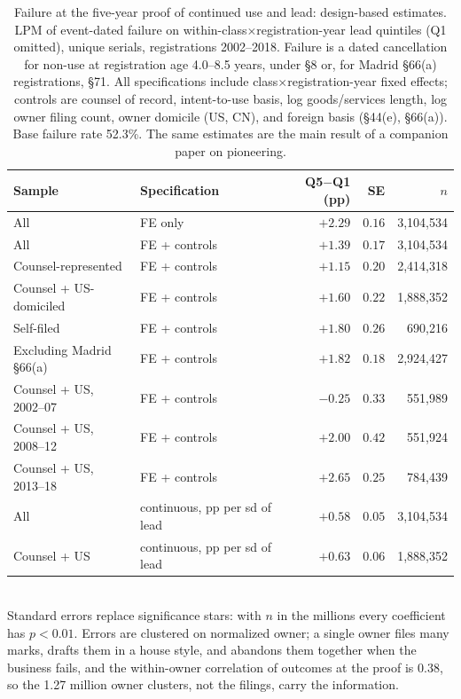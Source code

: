 \begin{table}[!htbp]\centering\small
\caption{Failure at the five-year proof of continued use and lead:
design-based estimates. LPM of event-dated failure on
within-class$\times$registration-year lead quintiles (Q1 omitted),
unique serials, registrations 2002--2018. Failure is a dated
cancellation for non-use at registration age 4.0--8.5 years, under \S8
or, for Madrid \S66(a) registrations, \S71. All specifications include
class$\times$registration-year fixed effects; controls are counsel of
record, intent-to-use basis, log goods/services length, log owner
filing count, owner domicile (US, CN), and foreign basis (\S44(e),
\S66(a)). Base failure rate 52.3\%. The same estimates are the main
result of a companion paper on pioneering.}
\label{tab:gate_lpm}
\begin{tabular}{llrrr}
\toprule
Sample & Specification & Q5$-$Q1 (pp) & SE & $n$ \\
\midrule
All & FE only & $+2.29$ & $0.16$ & 3{,}104{,}534 \\
All & FE + controls & $+1.39$ & $0.17$ & 3{,}104{,}534 \\
Counsel-represented & FE + controls & $+1.15$ & $0.20$ & 2{,}414{,}318 \\
Counsel + US-domiciled & FE + controls & $+1.60$ & $0.22$ & 1{,}888{,}352 \\
Self-filed & FE + controls & $+1.80$ & $0.26$ & 690{,}216 \\
Excluding Madrid \S66(a) & FE + controls & $+1.82$ & $0.18$ & 2{,}924{,}427 \\
\midrule
Counsel + US, 2002--07 & FE + controls & $-0.25$ & $0.33$ & 551{,}989 \\
Counsel + US, 2008--12 & FE + controls & $+2.00$ & $0.42$ & 551{,}924 \\
Counsel + US, 2013--18 & FE + controls & $+2.65$ & $0.25$ & 784{,}439 \\
\midrule
All & continuous, pp per sd of lead & $+0.58$ & $0.05$ & 3{,}104{,}534 \\
Counsel + US & continuous, pp per sd of lead & $+0.63$ & $0.06$ & 1{,}888{,}352 \\
\bottomrule
\end{tabular}
\\[0.3em]\footnotesize Standard errors replace significance stars: with
$n$ in the millions every coefficient has $p < 0.01$. Errors are
clustered on normalized owner; a single owner files many marks, drafts
them in a house style, and abandons them together when the business
fails, and the within-owner correlation of outcomes at the proof is
$0.38$, so the 1.27 million owner clusters, not the filings, carry the
information.
\end{table}

